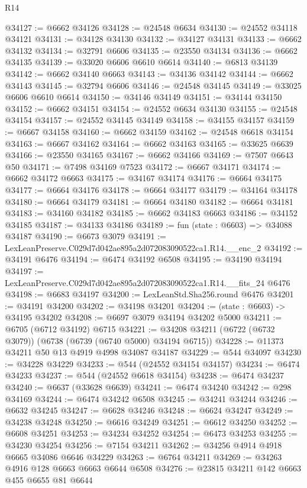 \begin{lexlean}{R14}
\begin{coremodule}
@34127 := @6662 @34126
@34128 := @24548 @6634
@34130 := @24552 @34118 @34121
@34131 := @34128 @34130
@34132 := @34127 @34131
@34133 := @6662 @34132
@34134 := @32791 @6606
@34135 := @23550 @34134
@34136 := @6662 @34135
@34139 := @33020 @6606 @6610 @6614
@34140 := @6813 @34139
@34142 := @6662 @34140 @6663
@34143 := @34136 @34142
@34144 := @6662 @34143
@34145 := @32794 @6606
@34146 := @24548 @34145
@34149 := @33025 @6606 @6610 @6614
@34150 := @34146 @34149
@34151 := @34144 @34150
@34152 := @6662 @34151
@34154 := @24552 @6634 @34130
@34155 := @24548 @34154
@34157 := @24552 @34145 @34149
@34158 := @34155 @34157
@34159 := @6667 @34158
@34160 := @6662 @34159
@34162 := @24548 @6618 @34154
@34163 := @6667 @34162
@34164 := @6662 @34163
@34165 := @33625 @6639
@34166 := @23550 @34165
@34167 := @6662 @34166
@34169 := @7507 @6643 @50
@34171 := @7498 @34169 @7523
@34172 := @6667 @34171
@34174 := @6662 @34172 @6663
@34175 := @34167 @34174
@34176 := @6664 @34175
@34177 := @6664 @34176
@34178 := @6664 @34177
@34179 := @34164 @34178
@34180 := @6664 @34179
@34181 := @6664 @34180
@34182 := @6664 @34181
@34183 := @34160 @34182
@34185 := @6662 @34183 @6663
@34186 := @34152 @34185
@34187 := @34133 @34186
@34189 := fun (state : @6603) => @34088 @34187
@34190 := @6673 @3079
@34191 := LexLeanPreserve.C029d7d042ae895a2d072083090522ca1.R14.__enc_2
@34192 := @34191 @6476
@34194 := @6474 @34192 @6508
@34195 := @34190 @34194
@34197 := LexLeanPreserve.C029d7d042ae895a2d072083090522ca1.R14.__fits_24 @6476
@34198 := @6683 @34197
@34200 := LexLeanStd.Sha256.round @6476
@34201 := @34191 @34200
@34202 := @34198 @34201
@34204 := (state : @6603) -> @34195 @34202
@34208 := @6697 @3079 @34194 @34202 @5000
@34211 := @6705 (@6712 @34192) @6715
@34221 := @34208 @34211 (@6722 (@6732 @3079)) (@6738 (@6739 (@6740 @5000) @34194 @6715))
@34228 := @11373 @34211 @50 @13 @4919 @4998 @34087 @34187
@34229 := @544 @34097
@34230 := @34228 @34229
@34233 := @544 (@24552 @34154 @34157)
@34234 := @6474 @34233
@34237 := @544 (@24552 @6618 @34154)
@34238 := @6474 @34237
@34240 := @6637 (@33628 @6639)
@34241 := @6474 @34240
@34242 := @298 @34169
@34244 := @6474 @34242 @6508
@34245 := @34241 @34244
@34246 := @6632 @34245
@34247 := @6628 @34246
@34248 := @6624 @34247
@34249 := @34238 @34248
@34250 := @6616 @34249
@34251 := @6612 @34250
@34252 := @6608 @34251
@34253 := @34234 @34252
@34254 := @6473 @34253
@34255 := @34230 @34254
@34256 := @7154 @34211
@34262 := @34256 @4914 @4918 @6665 @34086 @6646 @34229
@34263 := @6764 @34211
@34269 := @34263 @4916 @128 @6663 @6663 @6644 @6508
@34276 := @23815 @34211 @142 @6663 @455 @6655 @81 @6644

\end{coremodule}
\end{lexlean}
